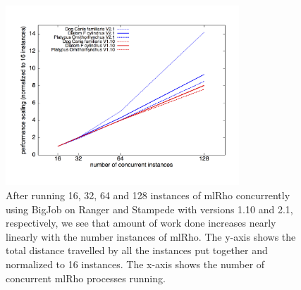 \documentclass{sig-alternate}
\begin{document}
\begin{figure}[t] %
\centering
\includegraphics[width=0.78\textwidth]{figures/bj-scaling.png}
\caption{After running 16, 32, 64 and 128 instances of mlRho concurrently using BigJob on Ranger and Stampede with versions 1.10 and 2.1, respectively, we see that amount of work done increases nearly linearly with the number instances of mlRho. The y-axis shows the total distance travelled by all the instances put together and normalized to 16 instances. The x-axis shows the number of concurrent mlRho processes running. }
\label{fig:bj-scaling}
\end{figure}

%
%
\end{document}
